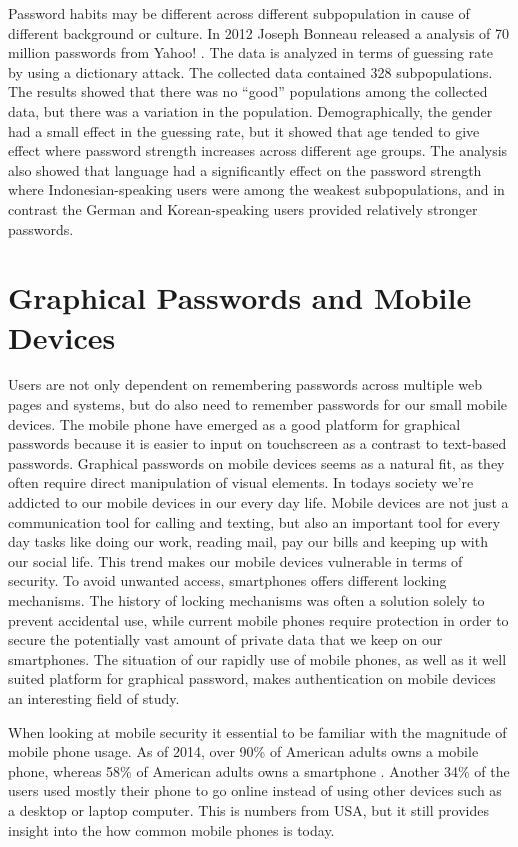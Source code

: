   Password habits may be different across different subpopulation in cause of different background or culture. In 2012 Joseph Bonneau released a analysis of 70 million passwords from Yahoo! \cite{Bonneau2}. The data is analyzed in terms of guessing rate by using a dictionary attack. The collected data contained 328 subpopulations. The results showed that there was no ``good'' populations among the collected data, but there was a variation in the population. Demographically, the gender had a small effect in the guessing rate, but it showed that age tended to give effect where password strength increases across different age groups. The analysis also showed that language had a significantly effect on the password strength where Indonesian-speaking users were among the weakest subpopulations, and in contrast the German and Korean-speaking users provided relatively stronger passwords. 

  

  \section{Graphical Passwords and Mobile Devices}
  Users are not only dependent on remembering passwords across multiple web pages and systems, but do also need to remember passwords for our small mobile devices. The mobile phone have emerged as a good platform for graphical passwords because it is easier to input on touchscreen as a contrast to text-based passwords. Graphical passwords on mobile devices seems as a natural fit, as they often require direct manipulation of visual elements. In todays society we're addicted to our mobile devices in our every day life. Mobile devices are not just a communication tool for calling and texting, but also an important tool for every day tasks like doing our work, reading mail, pay our bills and keeping up with our social life. This trend makes our mobile devices vulnerable in terms of security. To avoid unwanted access, smartphones offers different locking mechanisms. The history of locking mechanisms was often a solution solely to prevent accidental use, while current mobile phones require protection in order to secure the potentially vast amount of private data that we keep on our smartphones. The situation of our rapidly use of mobile phones, as well as it well suited platform for graphical password, makes authentication on mobile devices an interesting field of study.

  When looking at mobile security it essential to be familiar with the magnitude of mobile phone usage. As of 2014, over 90\% of American adults owns a mobile phone, whereas 58\% of American adults owns a smartphone \cite{MobileUseage}. Another 34\% of the users used mostly their phone to go online instead of using other devices such as a desktop or laptop computer. This is numbers from USA, but it still provides insight into the how common mobile phones is today.

